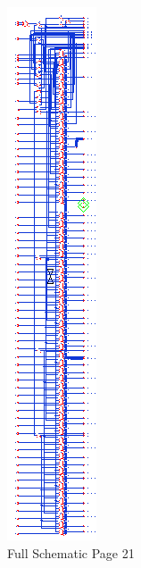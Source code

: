 \documentclass[11pt]{article}
\begin{document}
		
		\begin{figure}[H] 
			\centering 
			\includegraphics[width=\textwidth,height=\dimexpr\textheight-4\baselineskip-\abovecaptionskip-\belowcaptionskip\relax,keepaspectratio]{"Pictures/Full Schematic Page 21"}
			\caption{Full Schematic Page 21} 
			\label{fig:Full-Schematic-Page-21} 
		\end{figure}
		
\end{document}

